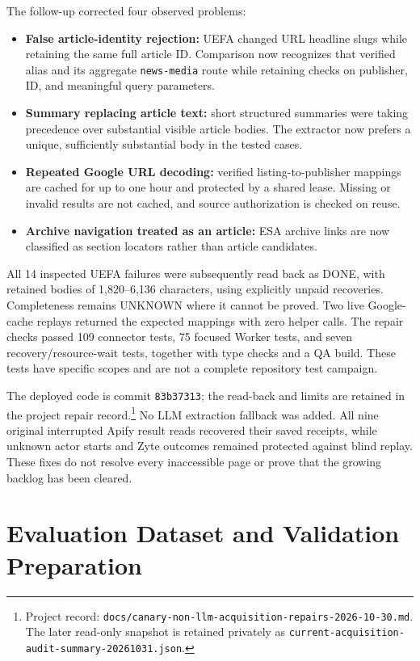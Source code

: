 The follow-up corrected four observed problems:
\begin{itemize}
\item \textbf{False article-identity rejection:} UEFA changed URL headline slugs while retaining the same full article ID. Comparison now recognizes that verified alias and its aggregate \texttt{news-media} route while retaining checks on publisher, ID, and meaningful query parameters.
\item \textbf{Summary replacing article text:} short structured summaries were taking precedence over substantial visible article bodies. The extractor now prefers a unique, sufficiently substantial body in the tested cases.
\item \textbf{Repeated Google URL decoding:} verified listing-to-publisher mappings are cached for up to one hour and protected by a shared lease. Missing or invalid results are not cached, and source authorization is checked on reuse.
\item \textbf{Archive navigation treated as an article:} ESA archive links are now classified as section locators rather than article candidates.
\end{itemize}

All 14 inspected UEFA failures were subsequently read back as DONE, with retained bodies of 1,820--6,136 characters, using explicitly unpaid recoveries. Completeness remains UNKNOWN where it cannot be proved. Two live Google-cache replays returned the expected mappings with zero helper calls. The repair checks passed 109 connector tests, 75 focused Worker tests, and seven recovery/resource-wait tests, together with type checks and a QA build. These tests have specific scopes and are not a complete repository test campaign.

The deployed code is commit \texttt{83b37313}; the read-back and limits are retained in the project repair record.\footnote{\raggedright Project record: \nolinkurl{docs/canary-non-llm-acquisition-repairs-2026-10-30.md}. The later read-only snapshot is retained privately as \nolinkurl{current-acquisition-audit-summary-20261031.json}.} No LLM extraction fallback was added. All nine original interrupted Apify result reads recovered their saved receipts, while unknown actor starts and Zyte outcomes remained protected against blind replay. These fixes do not resolve every inaccessible page or prove that the growing backlog has been cleared.

\section{Evaluation Dataset and Validation Preparation}

